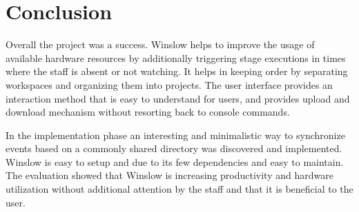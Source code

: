 \chapter{Conclusion}

Overall the project was a success.
Winslow helps to improve the usage of available hardware resources by additionally triggering stage executions in times where the staff is absent or not watching.
It helps in keeping order by separating workspaces and organizing them into projects.
The user interface provides an interaction method that is easy to understand for users, and provides upload and download mechanism without resorting back to console commands.

In the implementation phase an interesting and minimalistic way to synchronize events based on a commonly shared directory was discovered and implemented.
Winslow is easy to setup and due to its few dependencies and easy to maintain.
The evaluation showed that Winslow is increasing productivity and hardware utilization without additional attention by the staff and that it is beneficial to the user.